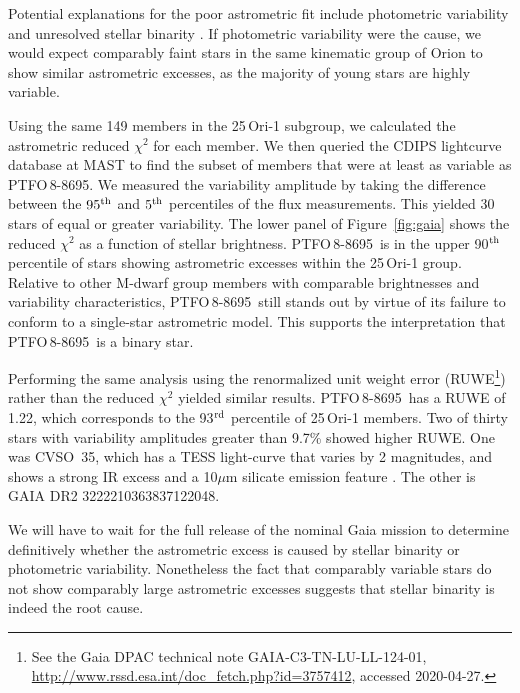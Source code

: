 \documentclass[12pt,twocolumn,tighten]{aastex62}
\newcommand{\ptfo}{PTFO$\,$8-8695}
\begin{document}
Potential explanations for the poor astrometric fit include
photometric variability and unresolved stellar binarity \citep[{\it
e.g.},][]{rizzuto_ZEIT8_2018,belokurov_unresolved_2020}.  If
photometric variability were the cause, we would expect comparably
faint stars in the same kinematic group of Orion to show similar
astrometric excesses, as the majority of young stars are highly
variable.

Using the same 149 members in the 25$\,$Ori-1 subgroup, we calculated
the astrometric reduced $\chi^2$ for each member.  We then queried the
CDIPS lightcurve database at MAST \citep{bouma_cluster_2019} to find
the subset of members that were at least as variable as \ptfo.  We
measured the variability amplitude by taking the difference between
the $95^{\rm th}$ and $5^{\rm th}$ percentiles of the flux
measurements.  This yielded 30 stars of equal or greater variability.
The lower panel of Figure~\ref{fig:gaia} shows the reduced $\chi^2$ as
a function of stellar brightness.  \ptfo\ is in the upper 90$^{\rm
th}$ percentile of stars showing astrometric excesses within the
25$\,$Ori-1 group.  Relative to other M-dwarf group members with
comparable brightnesses and variability characteristics, \ptfo\ still
stands out by virtue of its failure to conform to a single-star
astrometric model. This supports the interpretation that \ptfo\ is a
binary star.

Performing the same analysis using the renormalized unit weight error
(RUWE\footnote{ See the Gaia DPAC technical note
GAIA-C3-TN-LU-LL-124-01,
\url{http://www.rssd.esa.int/doc_fetch.php?id=3757412}, accessed
2020-04-27. }) rather than the reduced $\chi^2$ yielded similar
results.  \ptfo\ has a RUWE of 1{.}22, which corresponds to the
93$^{\rm rd}$ percentile of 25$\,$Ori-1 members.  Two of thirty stars
with variability amplitudes greater than 9.7\% showed higher RUWE.
One was CVSO~35, which has a TESS light-curve that varies by 2
magnitudes, and shows a strong IR excess and a 10$\mu$m silicate emission
feature \citep{mauco_herschel_2018}.  The other is GAIA DR2
3222210363837122048.

We will have to wait for the full release of the nominal Gaia mission
to determine definitively whether the astrometric excess is caused by
stellar binarity or photometric variability.  Nonetheless the fact
that comparably variable stars do not show comparably large
astrometric excesses suggests that stellar binarity is indeed the root
cause.
\end{document}
